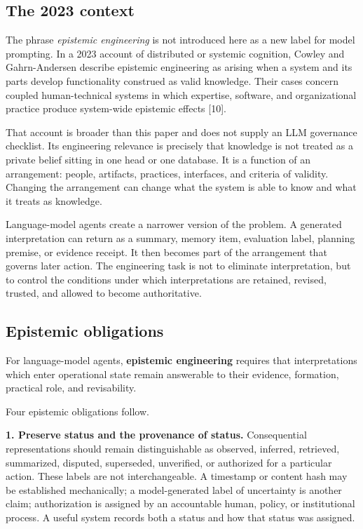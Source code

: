 \documentclass[12pt]{article}
\begin{document}
\subsection{The 2023 context}\label{the-2023-context}

The phrase \emph{epistemic engineering} is not introduced here as a new label for model prompting. In a 2023 account of distributed or systemic cognition, Cowley and Gahrn-Andersen describe epistemic engineering as arising when a system and its parts develop functionality construed as valid knowledge. Their cases concern coupled human-technical systems in which expertise, software, and organizational practice produce system-wide epistemic effects {[}10{]}.

That account is broader than this paper and does not supply an LLM governance checklist. Its engineering relevance is precisely that knowledge is not treated as a private belief sitting in one head or one database. It is a function of an arrangement: people, artifacts, practices, interfaces, and criteria of validity. Changing the arrangement can change what the system is able to know and what it treats as knowledge.

Language-model agents create a narrower version of the problem. A generated interpretation can return as a summary, memory item, evaluation label, planning premise, or evidence receipt. It then becomes part of the arrangement that governs later action. The engineering task is not to eliminate interpretation, but to control the conditions under which interpretations are retained, revised, trusted, and allowed to become authoritative.

\subsection{Epistemic obligations}\label{epistemic-obligations}

For language-model agents, \textbf{epistemic engineering} requires that interpretations which enter operational state remain answerable to their evidence, formation, practical role, and revisability.

Four epistemic obligations follow.

\textbf{1. Preserve status and the provenance of status.} Consequential representations should remain distinguishable as observed, inferred, retrieved, summarized, disputed, superseded, unverified, or authorized for a particular action. These labels are not interchangeable. A timestamp or content hash may be established mechanically; a model-generated label of uncertainty is another claim; authorization is assigned by an accountable human, policy, or institutional process. A useful system records both a status and how that status was assigned.
\end{document}
